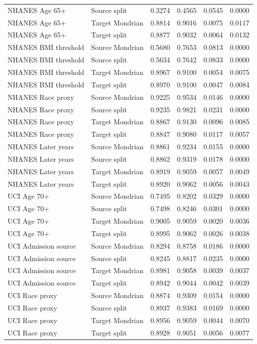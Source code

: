 \begin{longtable}{llrrrr}
NHANES Age 65+ & Source split & 0.3274 & 0.4565 & 0.0545 & 0.0000 \\
NHANES Age 65+ & Target Mondrian & 0.8814 & 0.9016 & 0.0075 & 0.0117 \\
NHANES Age 65+ & Target split & 0.8877 & 0.9032 & 0.0064 & 0.0132 \\
NHANES BMI threshold & Source Mondrian & 0.5680 & 0.7653 & 0.0813 & 0.0000 \\
NHANES BMI threshold & Source split & 0.5634 & 0.7642 & 0.0833 & 0.0000 \\
NHANES BMI threshold & Target Mondrian & 0.8967 & 0.9100 & 0.0054 & 0.0075 \\
NHANES BMI threshold & Target split & 0.8970 & 0.9100 & 0.0047 & 0.0084 \\
NHANES Race proxy & Source Mondrian & 0.9225 & 0.9534 & 0.0146 & 0.0000 \\
NHANES Race proxy & Source split & 0.9235 & 0.9821 & 0.0231 & 0.0000 \\
NHANES Race proxy & Target Mondrian & 0.8867 & 0.9130 & 0.0096 & 0.0085 \\
NHANES Race proxy & Target split & 0.8847 & 0.9080 & 0.0117 & 0.0057 \\
NHANES Later years & Source Mondrian & 0.8861 & 0.9234 & 0.0155 & 0.0000 \\
NHANES Later years & Source split & 0.8862 & 0.9319 & 0.0178 & 0.0000 \\
NHANES Later years & Target Mondrian & 0.8919 & 0.9059 & 0.0057 & 0.0049 \\
NHANES Later years & Target split & 0.8920 & 0.9062 & 0.0056 & 0.0043 \\
UCI Age 70+ & Source Mondrian & 0.7495 & 0.8202 & 0.0329 & 0.0000 \\
UCI Age 70+ & Source split & 0.7498 & 0.8246 & 0.0301 & 0.0000 \\
UCI Age 70+ & Target Mondrian & 0.9005 & 0.9059 & 0.0020 & 0.0036 \\
UCI Age 70+ & Target split & 0.8995 & 0.9062 & 0.0026 & 0.0038 \\
UCI Admission source & Source Mondrian & 0.8294 & 0.8758 & 0.0186 & 0.0000 \\
UCI Admission source & Source split & 0.8245 & 0.8817 & 0.0235 & 0.0000 \\
UCI Admission source & Target Mondrian & 0.8981 & 0.9058 & 0.0039 & 0.0037 \\
UCI Admission source & Target split & 0.8942 & 0.9044 & 0.0042 & 0.0039 \\
UCI Race proxy & Source Mondrian & 0.8874 & 0.9309 & 0.0154 & 0.0000 \\
UCI Race proxy & Source split & 0.8937 & 0.9383 & 0.0169 & 0.0000 \\
UCI Race proxy & Target Mondrian & 0.8956 & 0.9059 & 0.0044 & 0.0070 \\
UCI Race proxy & Target split & 0.8928 & 0.9051 & 0.0056 & 0.0077 \\
\bottomrule
\end{longtable}
